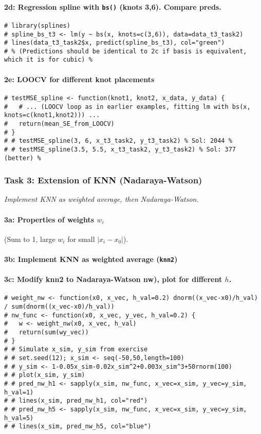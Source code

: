 \documentclass[12pt,a4paper]{article}
\newcommand{\Rfunction}[1]{\texttt{#1()}} %
\newcommand{\Rcode}[1]{\texttt{#1}} %
\begin{document}
            \paragraph{2d: Regression spline with \Rfunction{bs} (knots 3,6). Compare preds.}
\begin{lstlisting}
# library(splines)
# spline_bs_t3 <- lm(y ~ bs(x, knots=c(3,6)), data=data_t3_task2)
# lines(data_t3_task2$x, predict(spline_bs_t3), col="green")
# % (Predictions should be identical to 2c if basis is equivalent, which it is for cubic) %
\end{lstlisting}
            \paragraph{2e: LOOCV for different knot placements}
\begin{lstlisting}
# testMSE_spline <- function(knot1, knot2, x_data, y_data) {
#   # ... (LOOCV loop as in earlier examples, fitting lm with bs(x, knots=c(knot1,knot2))) ...
#   return(mean_SE_from_LOOCV)
# }
# # testMSE_spline(3, 6, x_t3_task2, y_t3_task2) % Sol: 2044 %
# # testMSE_spline(3.5, 5.5, x_t3_task2, y_t3_task2) % Sol: 377 (better) %
\end{lstlisting}

        \subsubsection{Task 3: Extension of KNN (Nadaraya-Watson)}
            \textit{Implement KNN as weighted average, then Nadaraya-Watson.}
            \paragraph{3a: Properties of weights $w_i$} (Sum to 1, large $w_i$ for small $|x_i-x_0|$).
            \paragraph{3b: Implement KNN as weighted average (\Rcode{knn2})}
            \paragraph{3c: Modify knn2 to Nadaraya-Watson nw), plot for different $h$.}
\begin{lstlisting}
# weight_nw <- function(x0, x_vec, h_val=0.2) dnorm((x_vec-x0)/h_val) / sum(dnorm((x_vec-x0)/h_val))
# nw_func <- function(x0, x_vec, y_vec, h_val=0.2) {
#   w <- weight_nw(x0, x_vec, h_val)
#   return(sum(wy_vec))
# }
# # Simulate x_sim, y_sim from exercise
# # set.seed(12); x_sim <- seq(-50,50,length=100)
# # y_sim <- 1-0.05x_sim-0.02x_sim^2+0.003x_sim^3+50rnorm(100)
# # plot(x_sim, y_sim)
# # pred_nw_h1 <- sapply(x_sim, nw_func, x_vec=x_sim, y_vec=y_sim, h_val=1)
# # lines(x_sim, pred_nw_h1, col="red")
# # pred_nw_h5 <- sapply(x_sim, nw_func, x_vec=x_sim, y_vec=y_sim, h_val=5)
# # lines(x_sim, pred_nw_h5, col="blue")
\end{lstlisting}
\end{document}
